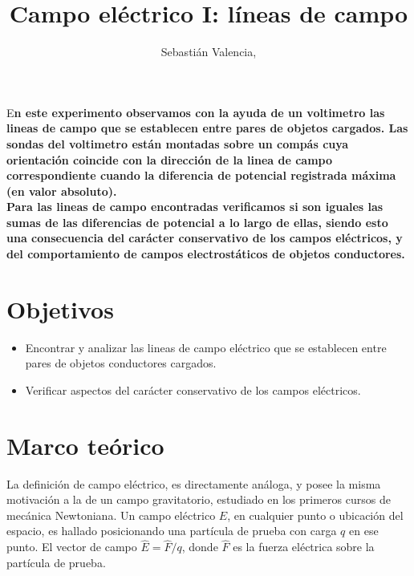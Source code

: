\documentclass[DIV=calc, paper=a4, fontsize=11pt, twocolumn, spanish]{scrartcl}	 %
\title{Campo eléctrico I: líneas de campo} %
\author{Sebastián Valencia, } %
\date{} %
\newcommand{\initial}[1]{ %
\lettrine[lines=3,lhang=0.3,nindent=0em]{
\color{DarkGoldenrod}
{\textsf{#1}}}{}}
\begin{document}
\maketitle %

\thispagestyle{fancy} %


\initial{E}\textbf{n este experimento observamos con la ayuda de un voltimetro las lineas de campo que se establecen entre pares de objetos cargados. Las sondas del voltimetro están montadas sobre un compás cuya orientación coincide con la dirección de la linea de campo correspondiente cuando la diferencia de potencial registrada máxima (en valor absoluto).}\\

\textbf{Para las lineas de campo encontradas verificamos si son iguales las sumas de las diferencias de potencial a lo largo de ellas, siendo esto una consecuencia del carácter conservativo de los campos eléctricos, y del comportamiento de campos electrostáticos de objetos conductores.}


\section*{Objetivos}

\begin{itemize}
\item Encontrar y analizar las lineas de campo eléctrico que se establecen entre pares de objetos conductores cargados.

\item Verificar aspectos del carácter conservativo de los campos eléctricos.
\end{itemize}


\section*{Marco teórico}

La definición de campo eléctrico, es directamente análoga, y posee la misma motivación a la de un campo gravitatorio, estudiado en los primeros cursos de mecánica Newtoniana. Un campo eléctrico $E$, en cualquier punto o ubicación del espacio, es hallado posicionando una partícula de prueba con carga $q$ en ese punto. El vector de campo $\hat{E} = \hat{F} / q$, donde $\hat{F}$ es la fuerza eléctrica sobre la partícula de prueba. 
\end{document}
